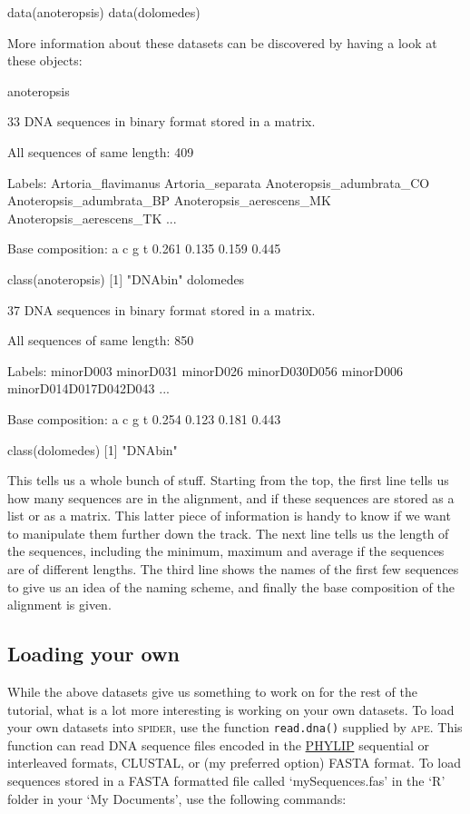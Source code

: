 \documentclass{article}
\newcommand{\Spider}{\textsc{spider}} %
\newcommand{\progname}[1]{\textsc{#1}}
\newcommand{\fun}[1]{\texttt{#1}}
\begin{document}
\begin{console}
data(anoteropsis)
data(dolomedes)
\end{console}

More information about these datasets can be discovered by having a look at these objects: 

\begin{console}
anoteropsis
\end{console}

\begin{Routput}
33 DNA sequences in binary format stored in a matrix.

All sequences of same length: 409 

Labels: Artoria_flavimanus Artoria_separata Anoteropsis_adumbrata_CO 
Anoteropsis_adumbrata_BP Anoteropsis_aerescens_MK Anoteropsis_aerescens_TK ...

Base composition:
    a     c     g     t 
0.261 0.135 0.159 0.445
\end{Routput}

\begin{Rio}
class(anoteropsis)
[1] "DNAbin"
dolomedes
\end{Rio}

\begin{Routput}
37 DNA sequences in binary format stored in a matrix.

All sequences of same length: 850 

Labels: minorD003 minorD031 minorD026 minorD030D056 minorD006 
minorD014D017D042D043 ...

Base composition:
    a     c     g     t 
0.254 0.123 0.181 0.443
\end{Routput}

\begin{Rio}
class(dolomedes)
[1] "DNAbin"
\end{Rio}

This tells us a whole bunch of stuff. Starting from the top, the first line tells us how many sequences are in the alignment, and if these sequences are stored as a list or as a matrix. This latter piece of information is handy to know if we want to manipulate them further down the track. The next line tells us the length of the sequences, including the minimum, maximum and average if the sequences are of different lengths. The third line shows the names of the first few sequences to give us an idea of the naming scheme, and finally the base composition of the alignment is given.

\subsection{Loading your own}
While the above datasets give us something to work on for the rest of the tutorial, what is a lot more interesting is working on your own datasets. To load your own datasets into \Spider, use the function \fun{read.dna()} supplied by \progname{ape}. This function can read DNA sequence files encoded in the \href{http://cmgm.stanford.edu/phylip/formats.html#6}{PHYLIP} sequential or interleaved formats, CLUSTAL, or (my preferred option) FASTA format. To load sequences stored in a FASTA formatted file called `mySequences.fas' in the `R' folder in your `My Documents', use the following commands:
\end{document}
